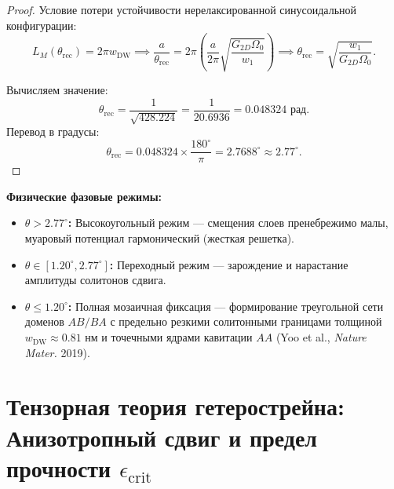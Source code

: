 \documentclass[12pt,a4paper]{article}
\begin{document}
\begin{proof}
	Условие потери устойчивости нерелаксированной синусоидальной конфигурации:
	\begin{equation}
		L_M(\theta_{\text{rec}}) = 2\pi w_{\text{DW}} \implies \frac{a}{\theta_{\text{rec}}} = 2\pi \left( \frac{a}{2\pi} \sqrt{\frac{G_{2D} \Omega_0}{w_1}} \right) \implies \theta_{\text{rec}} = \sqrt{\frac{w_1}{G_{2D} \Omega_0}}.
	\end{equation}
	
	Вычисляем значение:
	\begin{equation}
		\theta_{\text{rec}} = \frac{1}{\sqrt{428.224}} = \frac{1}{20.6936} = \mathbf{0.048324\text{ рад}}.
	\end{equation}
	Перевод в градусы:
	\begin{equation}
		\theta_{\text{rec}} = 0.048324 \times \frac{180^\circ}{\pi} = \mathbf{2.7688^\circ} \approx \mathbf{2.77^\circ}.
	\end{equation}
\end{proof}

\textbf{Физические фазовые режимы:}
\begin{itemize}
	\item \textbf{$\theta > 2.77^\circ$:} Высокоугольный режим — смещения слоев пренебрежимо малы, муаровый потенциал гармонический (жесткая решетка).
	\item \textbf{$\theta \in [1.20^\circ, 2.77^\circ]$:} Переходный режим — зарождение и нарастание амплитуды солитонов сдвига.
	\item \textbf{$\theta \le 1.20^\circ$:} Полная мозаичная фиксация — формирование треугольной сети доменов $AB/BA$ с предельно резкими солитонными границами толщиной $w_{\text{DW}} \approx 0.81\text{ нм}$ и точечными ядрами кавитации $AA$ (Yoo et al., \textit{Nature Mater.} 2019).
\end{itemize}

\section{Тензорная теория гетерострейна: Анизотропный сдвиг и предел прочности $\epsilon_{\mathrm{crit}}$}
\end{document}

